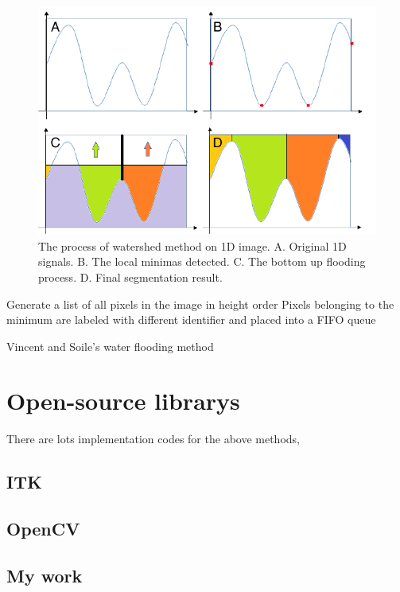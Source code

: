 \begin{figure}[htbp]
\centering
\includegraphics[width=1.0\textwidth]{images/imgseg_watershed}
\caption[The process of watershed method on 1D image]{The process of watershed method on 1D image. A. Original 1D signals. B. The local minimas detected. C. The bottom up flooding process. D. Final segmentation result.}
\label{fig:imgseg-watershed}
\end{figure}

\begin{algorithm}[H]
\SetAlgoLined
Generate a list of all pixels in the image in height order\;
Pixels belonging to the minimum are labeled with different identifier and placed into a FIFO queue\;
\caption{Vincent and Soile's water flooding method}
\label{alg:imgseg-watershed}
\end{algorithm}

\section{Open-source librarys}
There are lots implementation codes for the above methods, 
\subsection{ITK}
\subsection{OpenCV}
\subsection{My work}
